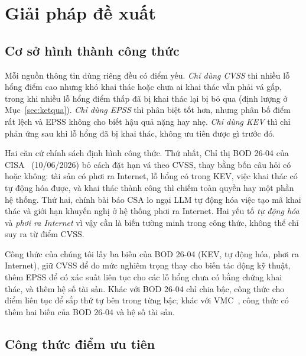 \documentclass[conference]{IEEEtran}
\begin{document}
\section{Giải pháp đề xuất}\label{sec:giaiphap}

\subsection{Cơ sở hình thành công thức}

Mỗi nguồn thông tin dùng riêng đều có điểm yếu. \emph{Chỉ dùng CVSS} thì nhiều lỗ hổng điểm cao nhưng
khó khai thác hoặc chưa ai khai thác vẫn phải vá gấp, trong khi nhiều lỗ hổng điểm thấp đã bị khai thác
lại bị bỏ qua (định lượng ở Mục~\ref{sec:ketqua}). \emph{Chỉ dùng EPSS} thì phân biệt tốt hơn, nhưng
phân bố điểm rất lệch và EPSS không cho biết hậu quả nặng hay nhẹ. \emph{Chỉ dùng KEV} thì chỉ phản ứng
sau khi lỗ hổng đã bị khai thác, không ưu tiên được gì trước đó.

Hai căn cứ chính sách định hình công thức. Thứ nhất, Chỉ thị BOD 26-04 của CISA~\cite{bod2604}
(10/06/2026) bỏ cách đặt hạn vá theo CVSS, thay bằng bốn câu hỏi có hoặc không: tài sản có phơi ra
Internet, lỗ hổng có trong KEV, việc khai thác có tự động hóa được, và khai thác thành công thì chiếm toàn quyền
hay một phần hệ thống. Thứ hai, chính bài báo CSA lo ngại LLM tự động hóa việc tạo mã khai thác và giới
hạn khuyến nghị ở hệ thống phơi ra Internet. Hai yếu tố \emph{tự động hóa} và \emph{phơi ra Internet}
vì vậy cần là biến tường minh trong công thức, không thể chỉ suy ra từ điểm CVSS.

Công thức của chúng tôi lấy ba biến của BOD 26-04 (KEV, tự động hóa, phơi ra Internet), giữ CVSS để đo
mức nghiêm trọng thay cho biến tác động kỹ thuật, thêm EPSS để có xác suất liên tục cho các lỗ hổng chưa
có bằng chứng khai thác, và thêm hệ số tài sản. Khác với BOD 26-04 chỉ chia bậc, công thức cho điểm liên
tục để sắp thứ tự bên trong từng bậc; khác với VMC~\cite{shimizu2026}, công thức có thêm hai biến của
BOD 26-04 và hệ số tài sản.

\subsection{Công thức điểm ưu tiên}
\end{document}
